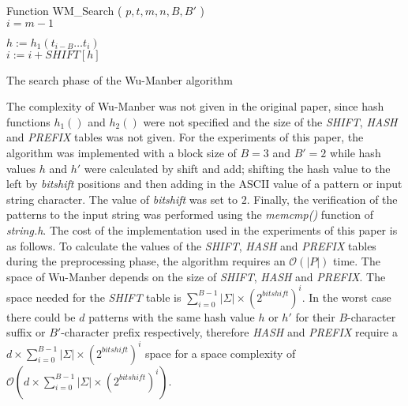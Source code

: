 \documentclass{ws-ijait}
\begin{document}
\begin{algorithm}[h]

Function WM\_Search ( $p, t, m, n, B, B'$ )\\

$i = m - 1$\\

 {

	$h := h_1(t_{i - B}\ldots t_i)$\\

	
	 {
		$i := i + SHIFT[h]$\\
	}
}

\caption{The search phase of the Wu-Manber algorithm}
\label{compl:wu_manber_search}
\end{algorithm}

The complexity of Wu-Manber was not given in the original paper, since hash functions $h_1()$ and $h_2()$ were not specified and the size of the \textit{SHIFT}, \textit{HASH} and \textit{PREFIX} tables was not given.\cite{Navarro2002} For the experiments of this paper, the algorithm was implemented with a block size of $B = 3$ and $B' = 2$ while hash values $h$ and $h'$ were calculated by shift and add; shifting the hash value to the left by \textit{bitshift} positions and then adding in the ASCII value of a pattern or input string character. The value of \textit{bitshift} was set to $2$. Finally, the verification of the patterns to the input string was performed using the \textit{memcmp()} function of \textit{string.h}. The cost of the implementation used in the experiments of this paper is as follows. To calculate the values of the \textit{SHIFT}, \textit{HASH} and \textit{PREFIX} tables during the preprocessing phase, the algorithm requires an $\mathcal{O}(|P|)$ time. The space of Wu-Manber depends on the size of \textit{SHIFT}, \textit{HASH} and \textit{PREFIX}. The space needed for the \textit{SHIFT} table is $\displaystyle\sum\limits_{i=0}^{B-1} |\Sigma| \times (2 ^ {bitshift})^i$. In the worst case there could be $d$ patterns with the same hash value $h$ or $h'$ for their $B$-character suffix or $B'$-character prefix respectively, therefore \textit{HASH} and \textit{PREFIX} require a $d \times \displaystyle\sum\limits_{i=0}^{B-1} |\Sigma| \times (2 ^ {bitshift})^i$ space for a space complexity of $\mathcal{O}(d \times \displaystyle\sum\limits_{i=0}^{B-1} |\Sigma| \times (2 ^ {bitshift})^i)$.
\end{document}
